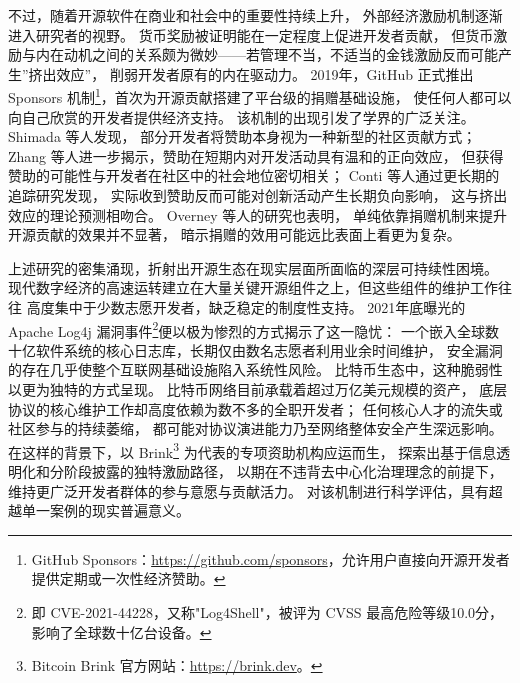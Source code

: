 不过，随着开源软件在商业和社会中的重要性持续上升，
外部经济激励机制逐渐进入研究者的视野。
货币奖励被证明能在一定程度上促进开发者贡献\cite{wang2022monetary}，
但货币激励与内在动机之间的关系颇为微妙——若管理不当，不适当的金钱激励反而可能产生”挤出效应”，
削弱开发者原有的内在驱动力\cite{benabou2003intrinsic,qiao2021mitigating}。
2019年，GitHub 正式推出 Sponsors 机制\footnote{GitHub Sponsors：\url{https://github.com/sponsors}，允许用户直接向开源开发者提供定期或一次性经济赞助。}，首次为开源贡献搭建了平台级的捐赠基础设施，
使任何人都可以向自己欣赏的开发者提供经济支持。
该机制的出现引发了学界的广泛关注。
Shimada 等人\cite{shimada2022github}发现，
部分开发者将赞助本身视为一种新型的社区贡献方式；
Zhang 等人\cite{zhang2022who}进一步揭示，赞助在短期内对开发活动具有温和的正向效应，
但获得赞助的可能性与开发者在社区中的社会地位密切相关；
Conti 等人\cite{conti2023incentivizing}通过更长期的追踪研究发现，
实际收到赞助反而可能对创新活动产生长期负向影响，
这与挤出效应的理论预测相吻合。
Overney 等人\cite{overney2020not}的研究也表明，
单纯依靠捐赠机制来提升开源贡献的效果并不显著，
暗示捐赠的效用可能远比表面上看更为复杂。

上述研究的密集涌现，折射出开源生态在现实层面所面临的深层可持续性困境。
现代数字经济的高速运转建立在大量关键开源组件之上，但这些组件的维护工作往往
高度集中于少数志愿开发者，缺乏稳定的制度性支持。
2021年底曝光的 Apache Log4j 漏洞事件\footnote{即 CVE-2021-44228，又称"Log4Shell"，被评为 CVSS 最高危险等级10.0分，影响了全球数十亿台设备。}便以极为惨烈的方式揭示了这一隐忧：
一个嵌入全球数十亿软件系统的核心日志库，长期仅由数名志愿者利用业余时间维护，
安全漏洞的存在几乎使整个互联网基础设施陷入系统性风险\cite{alami2024sustainability}。
比特币生态中，这种脆弱性以更为独特的方式呈现。
比特币网络目前承载着超过万亿美元规模的资产，
底层协议的核心维护工作却高度依赖为数不多的全职开发者；
任何核心人才的流失或社区参与的持续萎缩，
都可能对协议演进能力乃至网络整体安全产生深远影响。
在这样的背景下，以 Brink\footnote{Bitcoin Brink 官方网站：\url{https://brink.dev}。} 为代表的专项资助机构应运而生，
探索出基于信息透明化和分阶段披露的独特激励路径，
以期在不违背去中心化治理理念的前提下，维持更广泛开发者群体的参与意愿与贡献活力\cite{wu2024governance}。
对该机制进行科学评估，具有超越单一案例的现实普遍意义。

